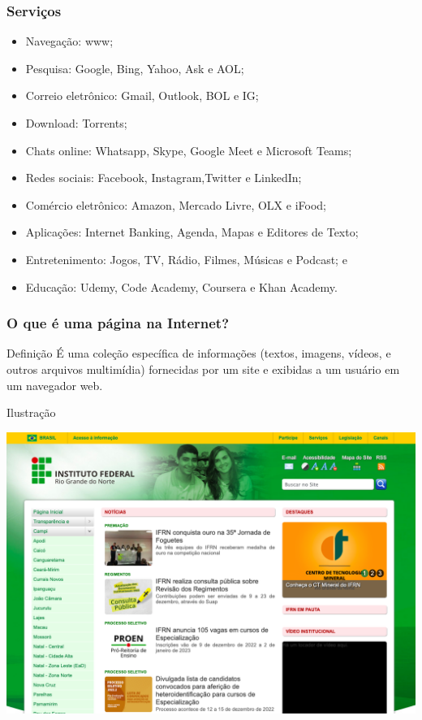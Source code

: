 \documentclass[aspectratio=169]{beamer} %
\begin{document}
\begin{frame}
	\frametitle{Servi\c cos}
			
	\begin{itemize}
		\item Navegação: www;
		\item Pesquisa: Google, Bing, Yahoo, Ask e AOL;	
		\item Correio eletrônico: Gmail, Outlook, BOL e IG;
		\item Download: Torrents;
		\item Chats online: Whatsapp, Skype, Google Meet e Microsoft Teams;
		\item Redes sociais: Facebook, Instagram,Twitter e LinkedIn;
		\item Comércio eletrônico: Amazon, Mercado Livre, OLX e iFood;
		\item Aplicações: Internet Banking, Agenda, Mapas e Editores de Texto;
		\item Entretenimento: Jogos, TV, Rádio, Filmes, Músicas e Podcast; e
		\item Educa\c cão: Udemy, Code Academy, Coursera e Khan Academy.
	\end{itemize}
\end{frame}

\begin{frame}
	\frametitle{O que é uma página na Internet?}
	
	\begin{block}{Defini\c cão}
		É uma coleção específica de informações (textos, imagens, vídeos, e outros arquivos multimídia) fornecidas por um site e exibidas a um usuário em um navegador web.
	\end{block} \vfill
			
	\begin{exampleblock}{Ilustra\c cão}
		\begin{center}
			\includegraphics[scale=0.13]{img/pagina}
		\end{center}
	\end{exampleblock}
\end{frame}
\end{document}
